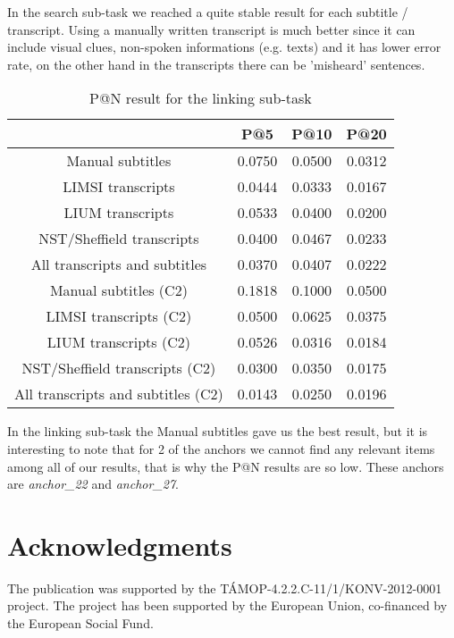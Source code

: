 \documentclass{acm_proc_article-me}
\begin{document}
In the search sub-task we reached a quite stable result for each subtitle / transcript. Using a manually written transcript is much better since it can include visual clues, non-spoken informations (e.g. texts) and it has lower error rate, on the other hand in the transcripts there can be 'misheard' sentences.


\begin{table}[h]
\begin{tabular}{|c|c|c|c|}
	\hline 
	& P@5 & P@10 & P@20\tabularnewline
	\hline 
	\hline 
	Manual subtitles & 0.0750 & 0.0500 & 0.0312\tabularnewline
	\hline 
	LIMSI transcripts & 0.0444 & 0.0333 & 0.0167\tabularnewline
	\hline 
	LIUM transcripts & 0.0533 & 0.0400 & 0.0200\tabularnewline
	\hline 
	NST/Sheffield transcripts & 0.0400 & 0.0467 & 0.0233\tabularnewline
	\hline 
	All transcripts and subtitles & 0.0370 & 0.0407 & 0.0222\tabularnewline
	\hline 
	Manual subtitles (C2) & 0.1818 & 0.1000 & 0.0500\tabularnewline
	\hline 
	LIMSI transcripts (C2) & 0.0500 & 0.0625 & 0.0375\tabularnewline
	\hline 
	LIUM transcripts (C2) & 0.0526 & 0.0316 & 0.0184\tabularnewline
	\hline 
	NST/Sheffield transcripts (C2) & 0.0300 & 0.0350 & 0.0175\tabularnewline	
	\hline 
	All transcripts and subtitles (C2) & 0.0143 & 0.0250 & 0.0196\tabularnewline	
	\hline 
\end{tabular}
\caption{P@N result for the linking sub-task}
\end{table}

In the linking sub-task the Manual subtitles gave us the best result, but it is interesting to note that for 2 of the anchors we cannot find any relevant items among all of our results, that is why the P@N results are so low. These anchors are \textit{anchor\_22} and \textit{anchor\_27}.

\section{Acknowledgments}

The publication was supported by the T\'AMOP-4.2.2.C-11/1/KONV-2012-0001 project. The project has been supported by the European Union, co-financed by the European Social Fund.


\normalsize{}
\end{document}
